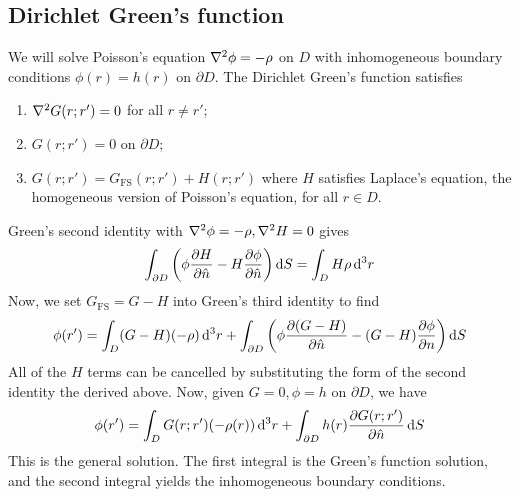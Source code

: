 \documentclass[a4paper]{article}
\begin{document}
\subsection{Dirichlet Green's function}
We will solve Poisson's equation \( \laplacian{\phi} = -\rho \) on \( D \) with inhomogeneous boundary conditions \( \phi(r) = h(r) \) on \( \partial D \).
The Dirichlet Green's function satisfies
\begin{enumerate}
	\item \( \laplacian{G(r;r')} = 0 \) for all \( r \neq r' \);
	\item \( G(r;r') = 0 \) on \( \partial D \);
	\item \( G(r;r') = G_{\mathrm{FS}}(r;r') + H(r;r') \) where \( H \) satisfies Laplace's equation, the homogeneous version of Poisson's equation, for all \( r \in D \).
\end{enumerate}
Green's second identity with \( \laplacian{\phi} = -\rho, \laplacian{H} = 0 \) gives
\[
	\int_{\partial D} \qty(\phi \pdv{H}{\hat n} - H \pdv{\phi}{\hat n}) \dd{S} = \int_D H \rho \dd[3]{r}
\]
Now, we set \( G_{\mathrm{FS}} = G - H \) into Green's third identity to find
\[
	\phi(r') = \int_D (G - H)(-\rho) \dd[3]{r} + \int_{\partial D} \qty(\phi \pdv{(G - H)}{\hat n} - (G-H) \pdv{\phi}{n}) \dd{S}
\]
All of the \( H \) terms can be cancelled by substituting the form of the second identity the derived above.
Now, given \( G = 0, \phi = h \) on \( \partial D \), we have
\[
	\phi(r') = \int_D G(r;r')(-\rho(r)) \dd[3]{r} + \int_{\partial D} h(r) \pdv{G(r;r')}{\hat n} \dd{S}
\]
This is the general solution.
The first integral is the Green's function solution, and the second integral yields the inhomogeneous boundary conditions.
\end{document}
